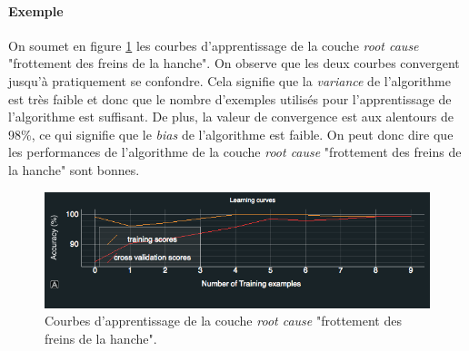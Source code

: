 \paragraph{Exemple}
On soumet en figure \ref{fig:Courbes d'apprentissage} les courbes d'apprentissage de la couche \emph{root cause} "frottement des freins de la hanche". On observe que les deux courbes convergent jusqu'à pratiquement se confondre. Cela signifie que la \emph{variance} de l'algorithme est très faible et donc que le nombre d'exemples utilisés pour l'apprentissage de l'algorithme est suffisant. De plus, la valeur de convergence est aux alentours de 98\%, ce qui signifie que le \emph{bias} de l'algorithme est faible. On peut donc dire que les performances de l'algorithme de la couche \emph{root cause} "frottement des freins de la hanche" sont bonnes. 

\begin{figure}[h]
\centering\includegraphics[width=12cm]{images/courbe_apprentissage.png}
\caption[Courbes d'apprentissage]{Courbes d'apprentissage de la couche \emph{root cause} "frottement des freins de la hanche".}
\label{fig:Courbes d'apprentissage}
\end{figure}